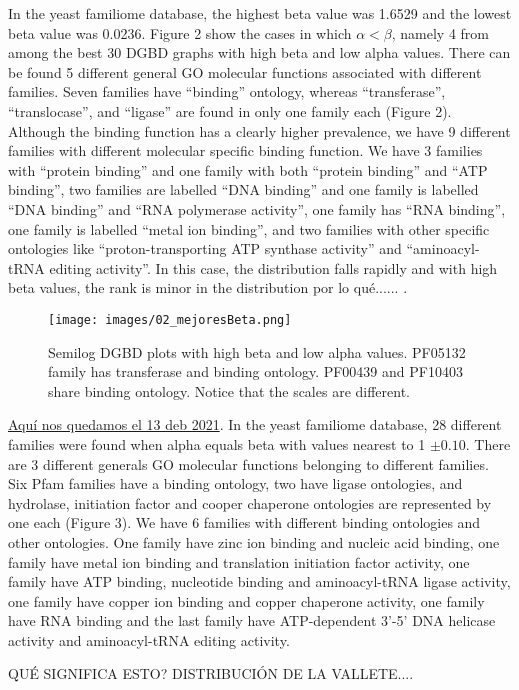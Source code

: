 \documentclass[preprint,12pt]{elsarticle}
\begin{document}
In the yeast familiome database, the highest beta value was 1.6529 and the lowest beta value was 0.0236. Figure 2 show the cases in which $\alpha < \beta $, namely  4 from among the best 30 DGBD graphs with high beta and low alpha values. There can be found 5 different general GO molecular functions associated  with different families. Seven families have ``binding'' ontology, whereas ``transferase'', ``translocase'', and ``ligase'' are found in only one family each (Figure 2). Although the binding function  has a clearly higher prevalence, we have 9 different families with different molecular specific binding function. We have 3 families with ``protein binding'' and one family with both ``protein binding'' and ``ATP binding'', two families are labelled ``DNA binding'' and one family is labelled ``DNA binding'' and ``RNA polymerase activity'', one family has ``RNA binding'', one family is labelled ``metal ion binding'', and two families with other specific ontologies like ``proton-transporting ATP synthase activity'' and ``aminoacyl-tRNA editing activity''. In this case, the distribution falls rapidly and with high beta values, the rank is minor in the distribution por lo qué...... 
\cite{martinez2009universality}.


\begin{figure} %
    \centering
    \texttt{[image: images/02\_mejoresBeta.png]}
    \bigbreak
    \caption {Semilog DGBD plots with high beta and low alpha values. PF05132 family has transferase and binding ontology. PF00439 and PF10403 share binding ontology. Notice that the scales are different.}
    \label{fig:beta}
\end{figure}
\clearpage

\underline{Aquí nos quedamos el 13 deb 2021}. In the yeast familiome database, 28 different families were found when alpha equals beta with values nearest to 1 $\pm0.10$. There are 3 different generals GO molecular functions belonging to different families. Six Pfam families have a binding ontology, two have ligase ontologies, and hydrolase, initiation factor and cooper chaperone ontologies are represented by one each (Figure 3). We have 6 families with different binding ontologies and other ontologies. One family have zinc ion binding and nucleic acid binding, one family have metal ion binding and translation initiation factor activity, one family have ATP binding, nucleotide binding and aminoacyl-tRNA ligase activity, one family have copper ion binding and copper chaperone activity, one family have RNA binding and the last family have ATP-dependent 3'-5' DNA helicase activity and aminoacyl-tRNA editing activity.  \par QUÉ SIGNIFICA ESTO? DISTRIBUCIÓN DE LA VALLETE.... \par
\end{document}

